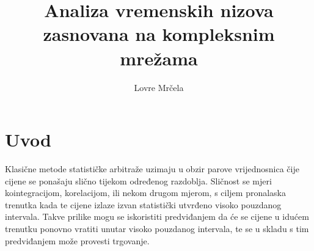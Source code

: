 \documentclass[lmodern, utf8, diplomski, numeric]{fer}
\begin{document}

\title{Analiza vremenskih nizova zasnovana na kompleksnim mrežama}

\author{Lovre Mrčela}

\maketitle



\tableofcontents

\chapter{Uvod}
  Klasične metode statističke arbitraže uzimaju u obzir parove vrijednosnica čije cijene se ponašaju slično tijekom određenog razdoblja.
  Sličnost se mjeri kointegracijom, korelacijom, ili nekom drugom mjerom, s ciljem pronalaska trenutka kada te cijene izlaze izvan statistički utvrđeno visoko pouzdanog intervala.
  Takve prilike mogu se iskoristiti predviđanjem da će se cijene u idućem trenutku ponovno vratiti unutar visoko pouzdanog intervala, te se u skladu s tim predviđanjem može provesti trgovanje.
  
\end{document}
